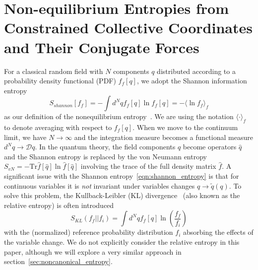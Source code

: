 \documentclass[11pt,a4paper]{article}
\begin{document}
\section{Non-equilibrium Entropies from Constrained Collective Coordinates and Their Conjugate Forces}
\label{sec:maxent}
For a classical random field with $N$ components $q$ distributed according to a probability density functional (PDF) $f_f[q]$,
we adopt the Shannon information entropy
\begin{equation}
  S_{shannon}[f_f] = -\int d^Nq f_f[q]\ln f_f[q] = -\langle \ln f_f \rangle_f
 \label{eqn:shannon_entropy}
\end{equation}
 as our definition of the nonequilibrium entropy~\cite{Shannon:1948,Cover:1991}.
 We are using the notation $\langle\cdot\rangle_{f}$ to denote averaging with respect to $f_f[q]$.
When we move to the continuum limit, we have $N \to \infty$ and the integration measure becomes a functional measure $d^Nq \to \mathcal{D}q$.
In the quantum theory, the field components $q$ become operators $\hat{q}$ and the Shannon entropy is replaced by the von Neumann entropy $S_{vN} = -\mathrm{Tr}\hat{f}[\hat{q}]\ln \hat{f}[\hat{q}]$ involving the trace of the full density matrix $\hat{f}$.
A significant issue with the Shannon entropy~\eqref{eqn:shannon_entropy} is that for continuous variables it is \emph{not} invariant under variables changes $q \to \tilde{q}(q)$.
To solve this problem, the Kullback-Leibler (KL) divergence~\cite{Kullback:1951,Cover:1991} (also known as the relative entropy) is often introduced
\begin{equation}
  S_{KL}(f_f||f_i) = \int d^Nq f_f[q]\ln\left(\frac{f_f}{f_i}\right)
\end{equation}
with the (normalized) reference probability distribution $f_i$ absorbing the effects of the variable change.
We do not explicitly consider the relative entropy in this paper, although we will explore a very similar approach in section~\ref{sec:noncanonical_entropy}.
\end{document}
